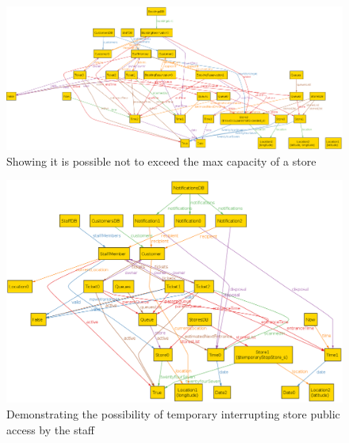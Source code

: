 \begin{figure} [H]
	\includegraphics[width=\linewidth]{../Alloy/maxOccupantsNotExceeded.png}
	\caption{Showing it is possible not to exceed the max capacity of a store}
	\label{fig:maxOccupantsNotExceeded}
\end{figure}

\begin{figure} [H]
	\includegraphics[width=\linewidth]{../Alloy/temporaryStopStore.png}
	\caption{Demonstrating the possibility of temporary interrupting store public access by the staff}
	\label{fig:temporaryStopStore}
\end{figure}

